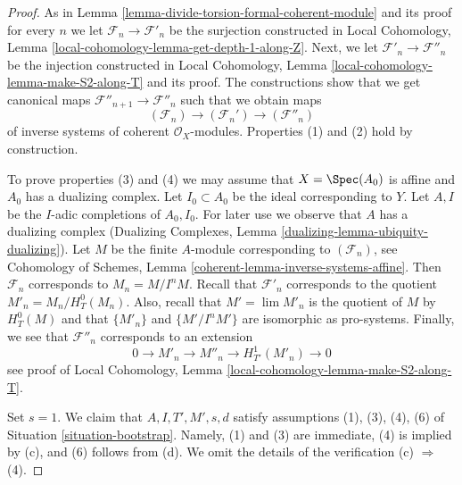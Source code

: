 \begin{proof}
As in Lemma \ref{lemma-divide-torsion-formal-coherent-module} and its proof
for every $n$ we let $\mathcal{F}_n \to \mathcal{F}'_n$ be the surjection
constructed in
Local Cohomology, Lemma \ref{local-cohomology-lemma-get-depth-1-along-Z}.
Next, we let $\mathcal{F}'_n \to \mathcal{F}''_n$ be the injection
constructed in
Local Cohomology, Lemma \ref{local-cohomology-lemma-make-S2-along-T}
and its proof. The constructions show that we get canonical maps
$\mathcal{F}''_{n + 1} \to \mathcal{F}''_n$ such that we obtain
maps
$$
(\mathcal{F}_n) \longrightarrow (\mathcal{F}_n') \longrightarrow
(\mathcal{F}''_n)
$$
of inverse systems of coherent $\mathcal{O}_X$-modules.
Properties (1) and (2) hold by construction.

\medskip\noindent
To prove properties (3) and (4) we may assume that $X = \Spec(A_0)$ is
affine and $A_0$ has a dualizing complex. Let $I_0 \subset A_0$ be the
ideal corresponding to $Y$. Let $A, I$ be the $I$-adic completions of
$A_0, I_0$. For later use we observe that $A$ has a dualizing complex
(Dualizing Complexes, Lemma \ref{dualizing-lemma-ubiquity-dualizing}).
Let $M$ be the finite $A$-module corresponding to $(\mathcal{F}_n)$, see
Cohomology of Schemes, Lemma \ref{coherent-lemma-inverse-systems-affine}.
Then $\mathcal{F}_n$ corresponds to $M_n = M/I^nM$. Recall that
$\mathcal{F}'_n$ corresponds to the quotient $M'_n = M_n / H^0_T(M_n)$.
Also, recall that $M' = \lim M'_n$ is the quotient of $M$ by
$H^0_T(M)$ and that $\{M'_n\}$ and $\{M'/I^nM'\}$ are isomorphic
as pro-systems. Finally, we see that $\mathcal{F}''_n$ corresponds
to an extension
$$
0 \to M'_n \to M''_n \to H^1_{T'}(M'_n) \to 0
$$
see proof of
Local Cohomology, Lemma \ref{local-cohomology-lemma-make-S2-along-T}.

\medskip\noindent
Set $s = 1$. We claim that $A, I, T', M', s, d$ satisfy assumptions
(1), (3), (4), (6) of Situation \ref{situation-bootstrap}. Namely, (1) and (3)
are immediate, (4) is implied by (c), and (6) follows from (d).
We omit the details of the verification (c) $\Rightarrow$ (4).


\end{proof}
